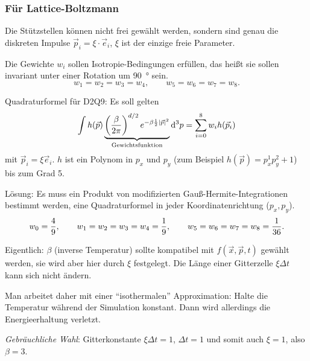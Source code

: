 \subsubsection*{Für Lattice-Boltzmann} Die Stützstellen können nicht frei gewählt
werden, sondern sind genau die diskreten Impulse $\vec{p}_i = \xi \cdot
\vec{e}_i$, $\xi$ ist der einzige freie Parameter.


Die Gewichte $w_i$ sollen Isotropie-Bedingungen erfüllen, das heißt sie sollen
invariant unter einer Rotation um \SI{90}{\degree} sein.
\[ w_1 = w_2 = w_3 = w_4, \qquad w_5 = w_6 = w_7 = w_8. \]

Quadraturformel für D2Q9: Es soll gelten
\[ \int h(\vec{p})
  \underbrace{
    \left( \frac{\beta}{2\pi} \right)^{d/2} e^{-\beta \frac{1}{2} |\vec{p}|^2}
  }_{\text{Gewichtsfunktion}}
  \mathrm{d}^3 p =
  \sum_{i=0}^8 w_i h(\vec{p}_i)
\]
mit $\vec{p}_i = \xi \vec{e}_i$. $h$ ist ein Polynom in $p_x$ und $p_y$ (zum
Beispiel $h(\vec{p}) = p_x^1 p_y^2 + 1$) bis zum Grad 5.

Lösung: Es muss ein Produkt von modifizierten Gauß-Hermite-Integrationen
bestimmt werden, eine Quadraturformel in jeder Koordinatenrichtung ($p_x, p_y$).
\[ w_0 = \frac{4}{9}, \qquad w_1 = w_2 = w_3 = w_4= \frac{1}{9},
  \qquad w_5 = w_6 = w_7 = w_8 = \frac{1}{36}. \]

Eigentlich: 
$\beta$ (inverse Temperatur) sollte kompatibel mit $f( \vec{x}, \vec{p}, t )$
gewählt werden, sie wird aber hier durch $\xi$ festgelegt. Die Länge einer
Gitterzelle $\xi \Delta t$ kann sich nicht ändern.

Man arbeitet daher mit einer ``isothermalen'' Approximation: Halte die
Temperatur während der Simulation konstant. Dann wird allerdings die
Energieerhaltung verletzt.

\emph{Gebräuchliche Wahl}: Gitterkonstante $\xi \Delta t = 1$, $\Delta t = 1$
und somit auch $\xi = 1$, also $\beta = 3$.

